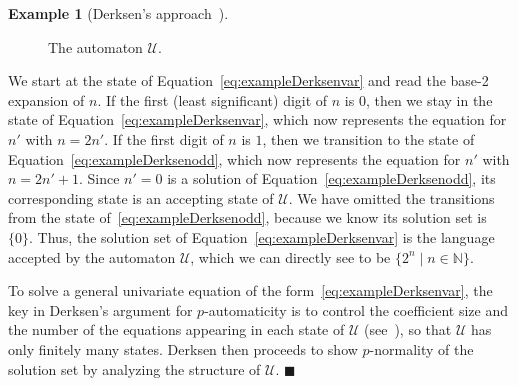 \documentclass[letterpaper, 11pt, thm-restate]{article}
\numberwithin{equation}{section}
\newcommand{\N}{\mathbb{N}}
\newcommand{\mmU}{\mathscr{U}}
\theoremstyle{definition}
\theoremstyle{definition}
\newtheorem{exmpl}[thrm]{Example}
\theoremstyle{definition}
\begin{document}
\begin{exmpl}[Derksen's approach~\cite{derksen2007skolem}]
\begin{figure}[h]
        \centering
        \vspace{-0.1cm}
        \vspace{-0.2cm}
        \caption{The automaton $\mmU$.}
        \label{fig:Derksen}
    \end{figure}
    We start at the state of Equation~\eqref{eq:exampleDerksenvar} and read the base-2 expansion of $n$.
    If the first (least significant) digit of $n$ is $0$, then we stay in the state of Equation~\eqref{eq:exampleDerksenvar}, which now represents the equation for $n'$ with $n = 2n'$.
    If the first digit of $n$ is $1$, then we transition to the state of Equation~\eqref{eq:exampleDerksenodd}, which now represents the equation for $n'$ with $n = 2n' + 1$.
    Since $n' = 0$ is a solution of Equation~\eqref{eq:exampleDerksenodd}, its corresponding state is an accepting state of $\mmU$.
    We have omitted the transitions from the state of~\eqref{eq:exampleDerksenodd}, because we know its solution set is $\{0\}$. %
    Thus, the solution set of Equation~\eqref{eq:exampleDerksenvar} is the language accepted by the automaton $\mmU$, which we can directly see to be $\{2^n \mid n \in \N\}$.

    To solve a general univariate equation of the form~\eqref{eq:exampleDerksenvar}, the key in Derksen's argument for $p$-automaticity is to control the coefficient size and the number of the equations appearing in each state of $\mmU$ (see~\cite[Proposition~5.2]{derksen2007skolem}), so that $\mmU$ has only finitely many states.
    Derksen then proceeds to show $p$-normality of the solution set by analyzing the structure of $\mmU$.
    \hfill $\blacksquare$
\end{exmpl}
\end{document}
